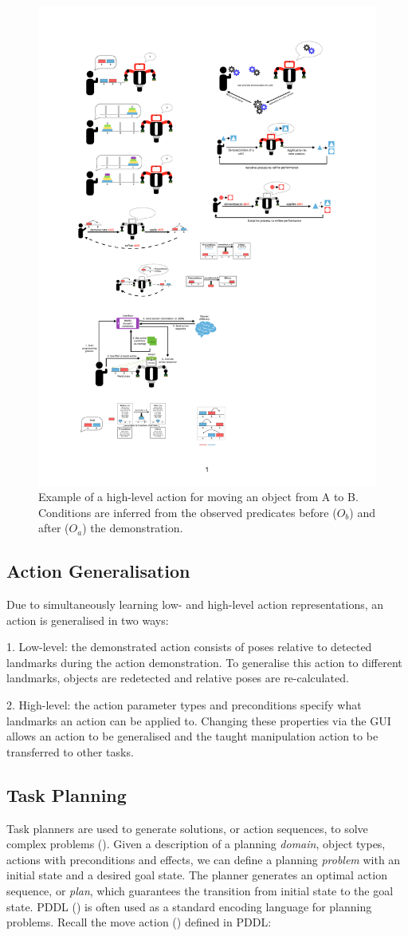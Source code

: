  
 \begin{figure}[h]
 	\centering
 	\includegraphics[width=0.5\linewidth]{figures/high-level.pdf}
 	\caption{Example of a high-level action for moving an object from A to B. Conditions are inferred from the observed predicates before ($O_b$) and after ($O_a$) the demonstration.
 	}
 	\label{fig:action-model}
 \end{figure}
 
\subsection{Action Generalisation}
\label{sec:generalisation}
Due to simultaneously learning low- and high-level action representations, an action is generalised in two ways:

1. Low-level: the demonstrated action consists of poses relative to detected landmarks during the action demonstration. 
To generalise this action to different landmarks, objects are redetected and relative poses are re-calculated.

2. High-level: the action parameter types and preconditions specify what landmarks an action can be applied to. 
Changing these properties via the GUI allows an action to be generalised and the taught manipulation action to be transferred to other tasks.


\subsection{Task Planning}
\label{sec:planning}
Task planners are used to generate solutions, or action sequences, to solve complex problems ().
Given a description of a planning \textit{domain}, \ie object types, actions with preconditions and effects, we can define a planning \textit{problem} with an initial state and a desired goal state. 
The planner generates an optimal action sequence, or \textit{plan}, which guarantees the transition from initial state to the goal state. 
PDDL () %
is often used as a standard encoding language for planning problems.
Recall the move action () defined in PDDL:

